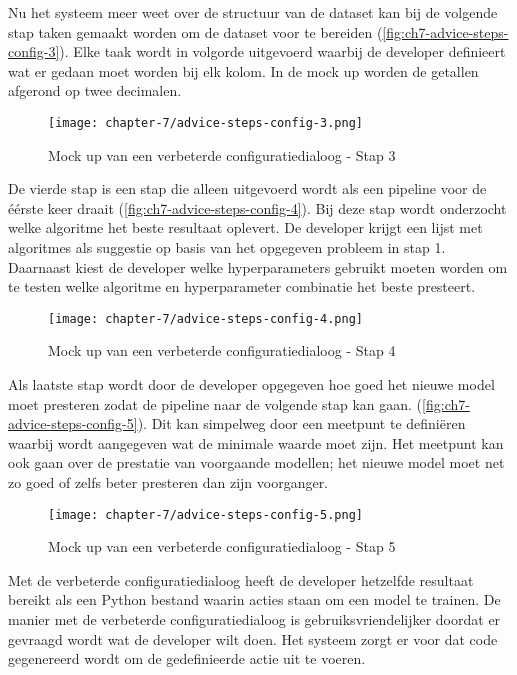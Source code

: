 Nu het systeem meer weet over de structuur van de dataset kan bij de volgende stap taken gemaakt worden om de dataset voor te bereiden (\autoref{fig:ch7-advice-steps-config-3}). Elke taak wordt in volgorde uitgevoerd waarbij de developer definieert wat er gedaan moet worden bij elk kolom. In de mock up worden de getallen afgerond op twee decimalen.

\begin{figure}[hbt!]
  \centering
  \texttt{[image: chapter-7/advice-steps-config-3.png]}
  \caption{Mock up van een verbeterde configuratiedialoog - Stap 3}
  \label{fig:ch7-advice-steps-config-3}
\end{figure}

De vierde stap is een stap die alleen uitgevoerd wordt als een pipeline voor de éérste keer draait (\autoref{fig:ch7-advice-steps-config-4}). Bij deze stap wordt onderzocht welke algoritme het beste resultaat oplevert. De developer krijgt een lijst met algoritmes als suggestie op basis van het opgegeven probleem in stap 1. Daarnaast kiest de developer welke hyperparameters gebruikt moeten worden om te testen welke algoritme en hyperparameter combinatie het beste presteert.

\begin{figure}[hbt!]
  \centering
  \texttt{[image: chapter-7/advice-steps-config-4.png]}
  \caption{Mock up van een verbeterde configuratiedialoog - Stap 4}
  \label{fig:ch7-advice-steps-config-4}
\end{figure}

Als laatste stap wordt door de developer opgegeven hoe goed het nieuwe model moet presteren zodat de pipeline naar de volgende stap kan gaan. (\autoref{fig:ch7-advice-steps-config-5}). Dit kan simpelweg door een meetpunt te definiëren waarbij wordt aangegeven wat de minimale waarde moet zijn. Het meetpunt kan ook gaan over de prestatie van voorgaande modellen; het nieuwe model moet net zo goed of zelfs beter presteren dan zijn voorganger.

\newpage

\begin{figure}[hbt!]
  \centering
  \texttt{[image: chapter-7/advice-steps-config-5.png]}
  \caption{Mock up van een verbeterde configuratiedialoog - Stap 5}
  \label{fig:ch7-advice-steps-config-5}
\end{figure}

Met de verbeterde configuratiedialoog heeft de developer hetzelfde resultaat bereikt als een Python bestand waarin acties staan om een model te trainen. De manier met de verbeterde configuratiedialoog is gebruiksvriendelijker doordat er gevraagd wordt wat de developer wilt doen. Het systeem zorgt er voor dat code gegenereerd wordt om de gedefinieerde actie uit te voeren.


